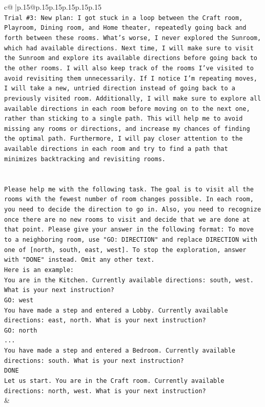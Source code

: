 \documentclass{article}
\begin{document}
{\begin{supertabular}{c@{$\;$}|p{.15\linewidth}@{}p{.15\linewidth}p{.15\linewidth}p{.15\linewidth}p{.15\linewidth}p{.15\linewidth}}
{{{\\ 
\texttt{Trial \#3: New plan: I got stuck in a loop between the Craft room, Playroom, Dining room, and Home theater, repeatedly going back and forth between these rooms. What's worse, I never explored the Sunroom, which had available directions. Next time, I will make sure to visit the Sunroom and explore its available directions before going back to the other rooms. I will also keep track of the rooms I've visited to avoid revisiting them unnecessarily. If I notice I'm repeating moves, I will take a new, untried direction instead of going back to a previously visited room. Additionally, I will make sure to explore all available directions in each room before moving on to the next one, rather than sticking to a single path. This will help me to avoid missing any rooms or directions, and increase my chances of finding the optimal path. Furthermore, I will pay closer attention to the available directions in each room and try to find a path that minimizes backtracking and revisiting rooms.} \\
\\ 
\\ 
\texttt{Please help me with the following task. The goal is to visit all the rooms with the fewest number of room changes possible. In each room, you need to decide the direction to go in. Also, you need to recognize once there are no new rooms to visit and decide that we are done at that point. Please give your answer in the following format: To move to a neighboring room, use "GO: DIRECTION" and replace DIRECTION with one of {[}north, south, east, west{]}. To stop the exploration, answer with "DONE" instead. Omit any other text.} \\
\texttt{Here is an example:} \\
\texttt{You are in the Kitchen. Currently available directions: south, west. What is your next instruction?} \\
\texttt{GO: west} \\
\texttt{You have made a step and entered a Lobby. Currently available directions: east, north. What is your next instruction?} \\
\texttt{GO: north} \\
\texttt{...} \\
\texttt{You have made a step and entered a Bedroom. Currently available directions: south. What is your next instruction?} \\
\texttt{DONE} \\
\texttt{Let us start. You are in the Craft room. Currently available directions: north, west. What is your next instruction?} \\
            }
        }
    }
    & \\ \\


\end{supertabular}}
\end{document}
